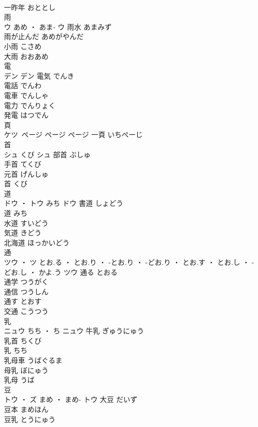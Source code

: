 \documentclass[8pt]{extreport}
\begin{document}
\begin{CJK}{UTF8}{min}
\\	一昨年	おととし	
\\	雨	
\\	ウ	あめ ・ あま-	ウ	雨水	あまみず	
\\	雨が止んだ	あめがやんだ	
\\	小雨	こさめ	
\\	大雨	おおあめ	
\\	電	
\\	デン		デン	電気	でんき	
\\	電話	でんわ	
\\	電車	でんしゃ	
\\	電力	でんりょく	
\\	発電	はつでん	
\\	頁	
\\	ケツ ページ	ページ	ページ													一頁	いちぺーじ	
\\	首	
\\	シュ	くび	シュ	部首	ぶしゅ	
\\	手首	てくび	
\\	元首	げんしゅ	
\\	首	くび	
\\	道	
\\	ドウ ・ トウ	みち	ドウ	書道	しょどう	
\\	道	みち	
\\	水道	すいどう	
\\	気道	きどう	
\\	北海道	ほっかいどう	
\\	通	
\\	ツウ ・ ツ	とお.る ・ とお.り ・ -とお.り ・ -どお.り ・ とお.す ・ とお.し ・ -どお.し ・ かよ.う	ツウ	通る	とおる	
\\	通学	つうがく	
\\	通信	つうしん	
\\	通す	とおす	
\\	交通	こうつう	
\\	乳	
\\	ニュウ	ちち ・ ち	ニュウ	牛乳	ぎゅうにゅう	
\\	乳首	ちくび	
\\	乳	ちち	
\\	乳母車	うばぐるま	
\\	母乳	ぼにゅう	
\\	乳母	うば	
\\	豆	
\\	トウ ・ ズ	まめ ・ まめ-	トウ	大豆	だいず	
\\	豆本	まめほん	
\\	豆乳	とうにゅう	

\end{CJK}
\end{document}
